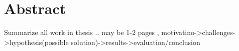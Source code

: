 \chapter*{Abstract}
\label{abstract}
Summarize all work in thesis .. may be 1-2 pages , motivatino->challenges->hypothesis(possible solution)->results->evaluation/conclusion

\lipsum[2-4]
